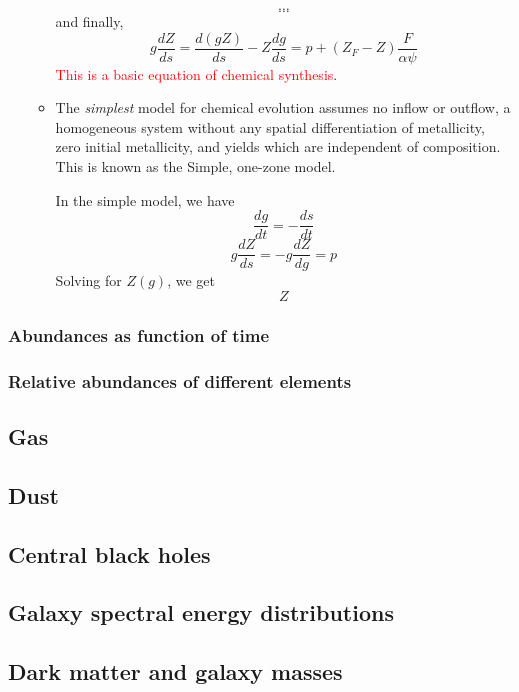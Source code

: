 \documentclass{article}
\begin{document}
\begin{itemize}
\begin{itemize}
                $$ \ldots $$
                $$ \ldots $$
                and finally,
                $$ g\frac{dZ}{ds} = \frac{d(gZ)}{ds} - Z\frac{dg}{ds} =
                p + (Z_F - Z)\frac{F}{\alpha\psi} $$
                \textcolor{red}{This is a basic equation of chemical synthesis}.
            \item The \emph{simplest} model for chemical evolution assumes no
                inflow or outflow, a homogeneous system without any spatial
                differentiation of metallicity, zero initial metallicity, and
                yields which are independent of composition. This is known as the
                Simple, one-zone model.

                In the simple model, we have
                $$ \frac{dg}{dt} = -\frac{ds}{dt} $$
                $$ g\frac{dZ}{ds} = -g\frac{dZ}{dg} = p $$
                Solving for $Z(g)$, we get
                $$ Z
                $$
        \end{itemize}
\end{itemize}
\subsubsection{Abundances as function of time}
\subsubsection{Relative abundances of different elements}



\subsection{Gas}
\subsection{Dust}
\subsection{Central black holes}
\subsection{Galaxy spectral energy distributions}
\subsection{Dark matter and galaxy masses}
\end{document}
